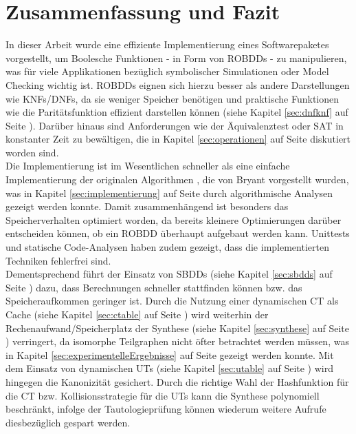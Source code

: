 \newpage
\section{Zusammenfassung und Fazit}
\label{sec:fazit}
In dieser Arbeit wurde eine effiziente Implementierung eines Softwarepaketes vorgestellt, um Boolesche Funktionen - in Form von ROBDDs - zu manipulieren, was für viele Applikationen bezüglich symbolischer Simulationen oder Model Checking wichtig ist. ROBDDs eignen sich hierzu besser als andere Darstellungen wie KNFs/DNFs, da sie weniger Speicher benötigen und praktische Funktionen wie die Paritätsfunktion effizient darstellen können (siehe Kapitel \ref{sec:dnfknf} auf Seite \pageref{sec:dnfknf}). Darüber hinaus sind Anforderungen wie der Äquivalenztest oder SAT in konstanter Zeit zu bewältigen, die in Kapitel \ref{sec:operationen} auf Seite \pageref{sec:operationen} diskutiert worden sind.\\
Die Implementierung ist im Wesentlichen schneller als eine einfache Implementierung der originalen Algorithmen \cite{b1986}, die von Bryant vorgestellt wurden, was in Kapitel \ref{sec:implementierung} auf Seite \pageref{sec:implementierung} durch algorithmische Analysen gezeigt werden konnte. Damit zusammenhängend ist besonders das Speicherverhalten optimiert worden, da bereits kleinere Optimierungen darüber entscheiden können, ob ein ROBDD überhaupt aufgebaut werden kann. Unittests und statische Code-Analysen haben zudem gezeigt, dass die implementierten Techniken fehlerfrei sind.\\
Dementsprechend führt der Einsatz von SBDDs (siehe Kapitel \ref{sec:sbdds} auf Seite \pageref{sec:sbdds}) dazu, dass Berechnungen schneller stattfinden können bzw. das Speicheraufkommen geringer ist. Durch die Nutzung einer dynamischen CT als Cache (siehe Kapitel \ref{sec:ctable} auf Seite \pageref{sec:ctable}) wird weiterhin der Rechenaufwand/Speicherplatz der Synthese (siehe Kapitel \ref{sec:synthese} auf Seite \pageref{sec:synthese}) verringert, da isomorphe Teilgraphen nicht öfter betrachtet werden müssen, was in Kapitel \ref{sec:experimentelleErgebnisse} auf Seite \pageref{sec:experimentelleErgebnisse} gezeigt werden konnte. Mit dem Einsatz von dynamischen UTs (siehe Kapitel \ref{sec:utable} auf Seite \pageref{sec:utable}) wird hingegen die Kanonizität gesichert. Durch die richtige Wahl der Hashfunktion für die CT bzw. Kollisionsstrategie für die UTs kann die Synthese polynomiell beschränkt, infolge der Tautologieprüfung können wiederum weitere Aufrufe diesbezüglich gespart werden.\\
